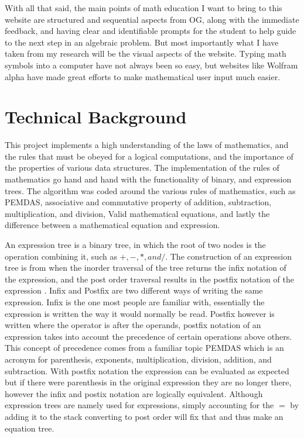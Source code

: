 \documentclass[10pt,twocolumn]{article}
\begin{document}
With all that said, the main points of math education I want to bring to this website are structured and sequential aspects from OG, along with the immediate feedback, and having clear and identifiable prompts for the student to help guide to the next step in an algebraic problem. But most importantly what I have taken from my research will be the visual aspects of the website. Typing math symbols into a computer have not always been so easy, but websites like Wolfram alpha have made great efforts to make mathematical user input much easier. 




\section{Technical Background}
This project implements a high understanding of the laws of mathematics, and the rules that must be obeyed for a logical computations, and the importance of the properties of various data structures. The implementation of the rules of mathematics go hand and hand with the functionality of binary, and expression trees. The algorithm was coded around the various rules of mathematics, such as PEMDAS, associative and commutative property of addition, subtraction, multiplication, and division, Valid mathematical equations, and lastly the difference between a mathematical equation and expression. 


An expression tree is a binary tree, in which the root of two nodes is the operation combining it, such as $+, -, *, and /$. The construction of an expression tree is from when the inorder traversal of the tree returns the infix notation of the expression, and the post order traversal results in the postfix notation of the expression \cite{noauthor_expression_2015}. Infix and Postfix are two different ways of writing the same expression. Infix is the one most people are familiar with, essentially the expression is written the way it would normally be read. Postfix however is written where the operator is after the operands, postfix notation of an expression takes into account the precedence of certain operations above others. This concept of precedence comes from a familiar topic PEMDAS which is an acronym for parenthesis, exponents, multiplication, division, addition, and subtraction. With postfix notation the expression can be evaluated as expected but if there were parenthesis in the original expression they are no longer there, however the infix and postix notation are logically equivalent. Although expression trees are namely used for expressions, simply accounting for the $=$ by adding it to the stack converting to post order will fix that and thus make an equation tree.  
\end{document}

